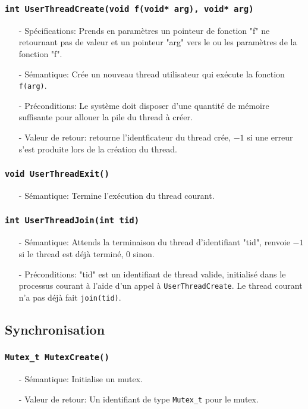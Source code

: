 \documentclass[11pt]{article}
\theoremstyle{definition}
\theoremstyle{definition}
\begin{document}
\subsubsection{\texttt{int UserThreadCreate(void f(void* arg), void* arg)}}
\begin{itemize}
\item[-] Spécifications: Prends en paramètres un pointeur de fonction "f" ne retournant pas de valeur
  et un pointeur "arg" vers le ou les paramètres de la fonction "f".
\item[-] Sémantique: Crée un nouveau thread utilisateur qui exécute la fonction \texttt{f(arg)}. 
\item[-] Préconditions: Le système doit disposer d'une quantité de mémoire suffisante pour allouer la
  pile du thread à créer. 
\item[-] Valeur de retour: retourne l'identficateur du thread crée, $-1$ si une erreur s'est produite lors de
  la création du thread.
\end{itemize}

\subsubsection{\texttt{void UserThreadExit()}}
\begin{itemize}
\item[-] Sémantique: Termine l'exécution du thread courant.
\end{itemize}

\subsubsection{\texttt{int UserThreadJoin(int tid)}}
\begin{itemize}
\item[-] Sémantique: Attends la terminaison du thread d'identifiant "tid", renvoie $-1$
  si le thread est déjà terminé, $0$ sinon.
\item[-] Préconditions: "tid" est un identifiant de thread valide, initialisé dans le processus courant
  à l'aide d'un appel à \texttt{UserThreadCreate}. Le thread courant n'a pas déjà fait \texttt{join(tid)}.
\end{itemize}

\subsection{Synchronisation}
\subsubsection{\texttt{Mutex\_t MutexCreate()}}
\begin{itemize}
\item[-]Sémantique: Initialise un mutex.
\item[-]Valeur de retour: Un identifiant de type \texttt{Mutex\_t} pour le mutex.
\end{itemize}
\end{document}
